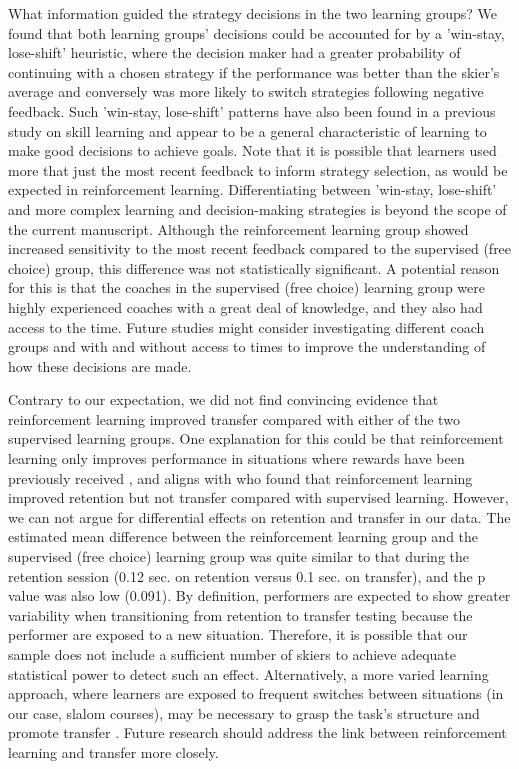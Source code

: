 \documentclass[pdflatex,sn-nature]{sn-jnl}%
\theoremstyle{thmstyleone}%
\theoremstyle{thmstyletwo}%
\theoremstyle{thmstylethree}%
\begin{document}
What information guided the strategy decisions in the two learning groups? We found that both learning groups' decisions could be accounted for by a 'win-stay, lose-shift' heuristic, where the decision maker had a greater probability of continuing with a chosen strategy if the performance was better than the skier's average and conversely was more likely to switch strategies following negative feedback. Such 'win-stay, lose-shift' patterns have also been found in a previous study on skill learning \cite{jordan_a_taylor_explicit_2014} and appear to be a general characteristic of learning to make good decisions to achieve goals. Note that it is possible that learners used more that just the most recent feedback to inform strategy selection, as would be expected in reinforcement learning. Differentiating between 'win-stay, lose-shift' and more complex learning and decision-making strategies is beyond the scope of the current manuscript. Although the reinforcement learning group showed increased sensitivity to the most recent feedback compared to the supervised (free choice) group, this difference was not statistically significant. A potential reason for this is that the coaches in the supervised (free choice) learning group were highly experienced coaches with a great deal of knowledge, and they also had access to the time. Future studies might consider investigating different coach groups and with and without access to times to improve the understanding of how these decisions are made.

Contrary to our expectation, we did not find convincing evidence that reinforcement learning improved transfer compared with either of the two supervised learning groups. One explanation for this could be that reinforcement learning only improves performance in situations where rewards have been previously received \cite{robertson_memory_2018}, and aligns with \citep{hasson_reinforcement_2015} who found that reinforcement learning improved retention but not transfer compared with supervised learning. However, we can not argue for differential effects on retention and transfer in our data. The estimated mean difference between the reinforcement learning group and the supervised (free choice) learning group was quite similar to that during the retention session (0.12 sec. on retention versus 0.1 sec. on transfer), and the p value was also low (0.091). By definition, performers are expected to show greater variability when transitioning from retention to transfer testing because the performer are exposed to a new situation. Therefore, it is possible that our sample does not include a sufficient number of skiers to achieve adequate statistical power to detect such an effect. Alternatively, a more varied learning approach, where learners are exposed to frequent switches between situations (in our case, slalom courses), may be necessary to grasp the task's structure and promote transfer \cite{braun_structure_2010}. Future research should address the link between reinforcement learning and transfer more closely. 
\end{document}
